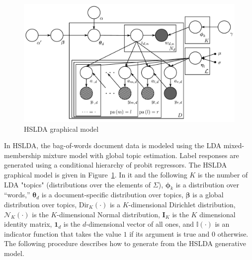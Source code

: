 %
\begin{figure}[t]
 \centering \includegraphics[scale=0.4]{Graphical_Model-final} \caption{HSLDA graphical model}


\label{fig:graphical_model} 
\end{figure}

In HSLDA, the bag-of-words document data is modeled using the LDA mixed-membership mixture model with global topic estimation.  Label responses are generated using a conditional hierarchy of probit regressors.   The HSLDA graphical model is given in Figure~\ref{fig:graphical_model}. In it and the following $K$ is the number of LDA "topics" (distributions over the elements of $\Sigma$), $\boldsymbol\phi_k$ is a distribution over ``words,'' $\boldsymbol\theta_d$ is a document-specific distribution over topics, $\boldsymbol\beta$ is a global distribution over topics, Dir$_{K}(\cdot)$ is a $K$-dimensional Dirichlet distribution, $\mathcal{N}_{K}(\cdot)$ is the $K$-dimensional Normal distribution, $\mathbf{I}_{K}$ is the $K$ dimensional identity matrix,  $\mathbf{1}_d$ is the $d$-dimensional vector of all ones, and $\mathbb{I}(\cdot)$ is an indicator function that takes the value $1$ if its argument is true and $0$ otherwise.  The following procedure describes how to generate from the HSLDA generative model.




